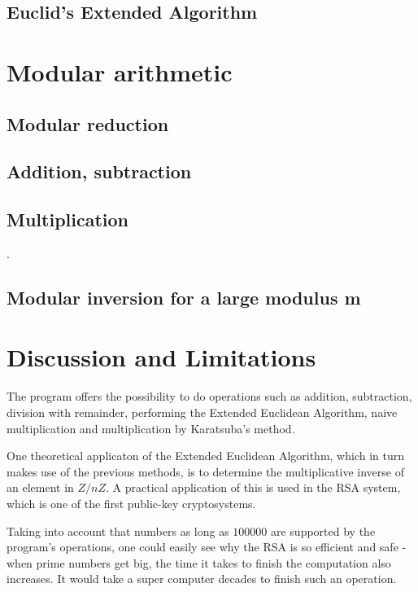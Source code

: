 \documentclass[a4paper]{article}
\begin{document}
\subsection{Euclid’s Extended Algorithm}


\section{Modular arithmetic}

\subsection{Modular reduction}

\subsection{Addition, subtraction}

\subsection{Multiplication}

\cite{shoup}.

\subsection{Modular inversion for a large modulus m}

\section{Discussion and Limitations}


The program offers the possibility to do operations such as addition, subtraction, division with remainder, performing the Extended Euclidean Algorithm, naive multiplication and multiplication by Karatsuba's method. 

One theoretical applicaton of the Extended Euclidean Algorithm, which in turn makes use of the previous methods, is to determine the multiplicative inverse of an element in $Z/nZ.$ A practical application of this is used in the RSA system, which is one of the first public-key cryptosystems. 

Taking into account that numbers as long as $100 000$ are supported by the program's operations, one could easily see why the RSA is so efficient and safe - when prime numbers get big, the time it takes to finish the computation also increases. It would take a super computer decades to finish such an operation. 
\end{document}
